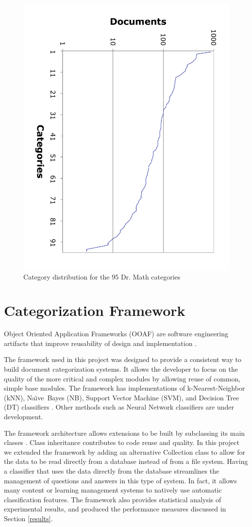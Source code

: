 \documentclass{ios}
\newcommand{\naive}{Na\"\i ve}
\begin{document}
\begin{figure}
\begin{center}
\includegraphics[angle=90,width=0.7\linewidth]{cat-distribution}
\end{center}
\caption{Category distribution for the 95 Dr. Math categories}
\label{cat-distribution}
\end{figure}


\section{Categorization Framework}

Object Oriented Application Frameworks (OOAF) are software engineering artifacts 
that improve reusability of design and implementation \cite{fayad:97, fayad:99}.

The framework used in this project was designed to provide a
consistent way to build document categorization
systems.\cite{williams:02} It allows the developer to focus on the
quality of the more critical and complex modules by allowing reuse of
common, simple base modules.  The framework has
implementations of 
k-Nearest-Neighbor (kNN), \naive\ Bayes (NB), Support Vector Machine (SVM), and
Decision Tree (DT) classifiers \cite{yang:99, sebastiani:02}. Other methods
such as Neural Network \cite{calvo:00, calvo:01} classifiers are under development.

The framework architecture allows extensions to be built by subclassing
its main classes \cite{williams:02}. Class inheritance contributes to code reuse and 
quality.
In this project we extended the framework by adding an alternative
Collection class to allow for the data to be read directly from a database instead of from a file system.  
Having a classifier that uses the data directly from the database
streamlines the management of questions and answers in this type of
system. In fact, it allows many content or learning management systems
to natively use automatic classification features.
The framework also provides statistical analysis of experimental results, and 
produced the performance measures discussed in Section \ref{results}.
\end{document}
